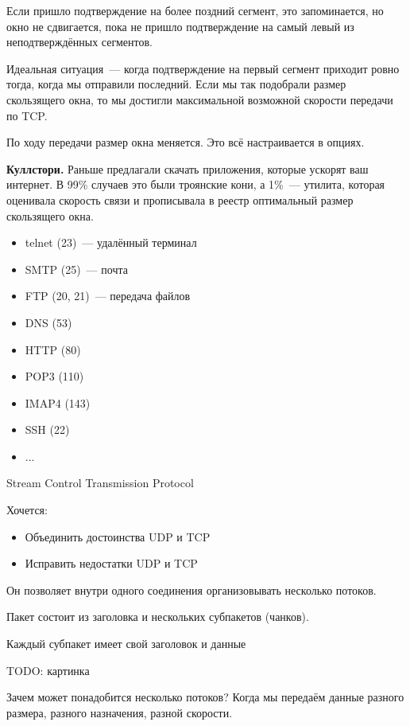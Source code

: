 Если пришло подтверждение на более поздний сегмент, это запоминается, но окно не сдвигается, пока не пришло подтверждение на самый левый из неподтверждённых сегментов.

Идеальная ситуация~--- когда подтверждение на первый сегмент приходит ровно тогда, когда мы отправили последний. Если мы так подобрали размер скользящего окна, то мы достигли максимальной возможной скорости передачи по TCP.

По ходу передачи размер окна меняется. Это всё настраивается в опциях.

{\bf Куллстори.} Раньше предлагали скачать приложения, которые ускорят ваш интернет. В 99\% случаев это были троянские кони, а 1\%~--- утилита, которая оценивала скорость связи и прописывала в реестр оптимальный размер скользящего окна.


\begin{itemize}
    \item telnet (23)~--- удалённый терминал
    \item SMTP (25)~--- почта
    \item FTP (20, 21)~--- передача файлов
    \item DNS (53)
    \item HTTP (80)
    \item POP3 (110)
    \item IMAP4 (143)
    \item SSH (22)
    \item ...
\end{itemize}


Stream Control Transmission Protocol

Хочется:
\begin{itemize}
    \item Объединить достоинства UDP и TCP
    \item Исправить недостатки UDP и TCP
\end{itemize}

Он позволяет внутри одного соединения организовывать несколько потоков.

Пакет состоит из заголовка и нескольких субпакетов (чанков).

Каждый субпакет имеет свой заголовок и данные

TODO: картинка

Зачем может понадобится несколько потоков? Когда мы передаём данные разного размера, разного назначения, разной скорости.

